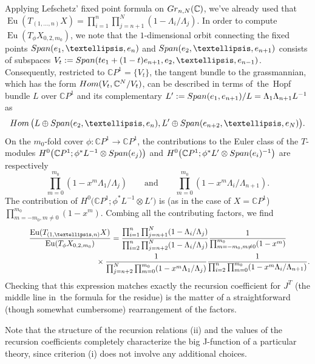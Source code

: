 \documentclass[11pt]{article}
\numberwithin{equation}{section}
\numberwithin{equation}{section}
\def\CC{\mathbb C}
\def\Eu{\operatorname{Eu}}
\begin{document}
Applying Lefschetz' fixed point formula on ${\rm Gr}_{n,N}(\CC)$, we've already used that $\Eu(T_{(1,\dots,n)}X)\!=\prod_{i=1}^n\prod_{j=n+1}^N(1-\Lambda_i/\Lambda_j)$. In order to compute $\Eu(T_{\phi}X_{0,2,m_0})$, we note that the $1$-dimensional orbit connecting the fixed points $\mathop{\rm Span} (e_1,\dots,e_n)$ and $\mathop{\rm Span} (e_2,\dots,e_{n+1})$ consists of subspaces $V_t:=\mathop{\rm Span}(t e_1+(1-t) e_{n+1}, e_2,\dots,e_{n-1})$. Consequently, restricted to $\CC P^1=\{ V_t \}$, the tangent bundle to the grassmannian, which has the form $\mathop{\rm Hom} (V_t,\CC^N/V_t)$, can be described in terms of~the~Hopf bundle $L$ over $\CC P^1$ and its complementary $L':=\mathop{\rm Span}(e_1,e_{n+1})/L=\Lambda_1\Lambda_{n+1}L^{-1}$ as
\[
\mathop{\rm Hom} \big(L \oplus \mathop{\rm Span}(e_2,\dots,e_n), L' \oplus \mathop{\rm Span}(e_{n+2},\dots,e_N)\big).
\]
On the $m_0$-fold cover $\phi\colon \CC P^1\to \CC P^1$, the contributions to the Euler class of the $T$-modules $H^0\big(\CC P^1; \phi^*L^{-1}\otimes \mathop{\rm Span} (e_j)\big)$ and $H^0\big(\CC P^1; \phi^*L'\otimes \mathop{\rm Span}(e_i)^{-1}\big)$ are respectively
\[
\prod_{m=0}^{m_0}(1-x^m\Lambda_1/\Lambda_j)\qquad \text{and}\qquad \prod_{m=0}^{m_0}(1-x^m\Lambda_i/\Lambda_{n+1}).
\]
The contribution of $H^0\big(\CC P^1; \phi^*L^{-1}\otimes L'\big)$ is (as in the case of $X=\CC P^1$) $\prod_{m=-m_0, m\neq 0}^{m_0}(1-x^m)$. Combing all the contributing factors, we find
\begin{gather*}
\frac{\Eu(T_{(1,\dots,n)}X)}{\Eu(T_{\phi}X_{0,2,m_0})}=
\frac{\prod_{i=1}^n\prod_{j=n+1}^N(1-\Lambda_i/\Lambda_j)}
{\prod_{i=2}^n\prod_{j=n+2}^N(1-\Lambda_i/\Lambda_j)}
\frac{1}{\prod_{m=-m_0, m\neq 0}^{m_0}(1-x^m)}
\\ \hphantom{\frac{\Eu(T_{(1,\dots,n)}X)}{\Eu(T_{\phi}X_{0,2,m_0})}=}
{}\times \frac{1}{\prod_{j=n+2}^N\prod_{m=0}^{m_0}(1-x^m\Lambda_1/\Lambda_j)}
\frac{1}{\prod_{i=2}^n\prod_{m=0}^{m_0}(1-x^m\Lambda_i/\Lambda_{n+1})}.
\end{gather*}
Checking that this expression matches exactly the recursion coefficient for $J^T$ (the middle line in~the formula for the residue) is the matter of a straightforward (though somewhat cumbersome) rearrangement of the factors.

\begin{Remark}\label{rmk3}
Note that the structure of the recursion relations (ii) and the values of the recursion coefficients completely characterize the big J-function of a particular theory, since criterion (i) does not involve any additional choices.
\end{Remark}
\end{document}
